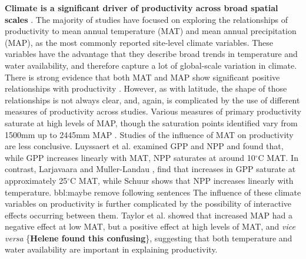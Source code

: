 \documentclass[]{article}
\begin{document}
\textbf{Climate is a significant driver of productivity across broad
spatial scales} \citep{cleveland_relationships_2011}. The majority of
studies have focused on exploring the relationships of productivity to
mean annual temperature (MAT) and mean annual precipitation (MAP), as
the most commonly reported site-level climate variables. These variables
have the advantage that they describe broad trends in temperature and
water availability, and therefore capture a lot of global-scale
variation in climate. There is strong evidence that both MAT and MAP
show significant positive relationships with productivity
\citep{chu_does_2016}. However, as with latitude, the shape of those
relationships is not always clear, and, again, is complicated by the use
of different measures of productivity across studies. Various measures
of primary productivity saturate at high levels of MAP, though the
saturation points identified vary from 1500mm \citep{luyssaert_co_2007}
up to 2445mm MAP \citep{schuur_productivity_2003}. Studies of the
influence of MAT on productivity are less conclusive. Luyssaert et al.
\citeyearpar{luyssaert_co_2007} examined GPP and NPP and found that,
while GPP increases linearly with MAT, NPP saturates at around
10\(^\circ\)C MAT. In contrast, Larjavaara and Muller-Landau
\citeyearpar{larjavaara_temperature_2012}, find that increases in GPP
saturate at approximately 25\(^\circ\)C MAT, while Schuur
\citeyearpar{schuur_productivity_2003} shows that NPP increases linearly
with temperature. bbl:maybe remove following sentences The influence of
these climate variables on productivity is further complicated by the
possibility of interactive effects occurring between them. Taylor et al.
\citeyearpar{taylor_temperature_2017} showed that increased MAP had a
negative effect at low MAT, but a positive effect at high levels of MAT,
and \emph{vice versa} \{\textbf{Helene found this confusing}\},
suggesting that both temperature and water availability are important in
explaining productivity.
\end{document}
